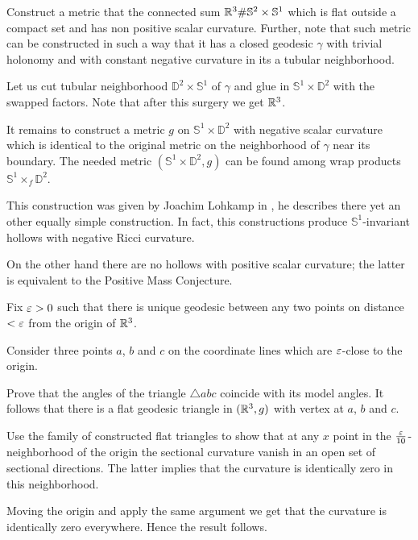 Construct a metric that the connected sum
$\mathbb{R}^3\#\mathbb{S}^2\times\mathbb{S}^1$
which is flat outside a compact set and has non positive scalar curvature.
Further, note that such metric can be constructed in such a way that it has a closed geodesic $\gamma$ with trivial holonomy and with constant negative curvature in its a tubular neighborhood.

Let us cut tubular neighborhood $\mathbb{D}^2\times \mathbb{S}^1$ of $\gamma$ and glue in $\mathbb{S}^1\times \mathbb{D}^2$ with the swapped factors. 
Note that after this surgery we get $\mathbb{R}^3$.

It remains to construct a metric $g$ on $\mathbb{S}^1\times \mathbb{D}^2$ with negative scalar curvature which 
is identical to the original metric on the neighborhood  of $\gamma$ near its boundary.
The needed metric $(\mathbb{S}^1\times \mathbb{D}^2,g)$ can be found among wrap products $\mathbb{S}^1\times_f \mathbb{D}^2$.
\qeds


This construction was given by Joachim Lohkamp in \cite{lohkamp},
he describes there yet an other equally simple construction.
In fact,
this  constructions produce 
$\mathbb{S}^1$-invariant hollows 
with negative Ricci curvature.

On the other hand there are no hollows with positive scalar curvature;
the latter is equivalent to the Positive Mass Conjecture.

Fix $\varepsilon>0$ such that there is unique geodesic between any two points on distance $<\varepsilon$ from the origin of $\mathbb{R}^3$.

Consider three points $a$, $b$ and $c$ 
on the coordinate lines which are $\varepsilon$-close 
to the origin.

Prove that the angles of the triangle $\triangle abc$
coincide with its model angles.
It follows that there is a flat geodesic triangle in $(\mathbb{R}^3,g)$ with vertex at $a$, $b$ and $c$.

Use the family of constructed flat triangles 
to show that at any $x$ point in the $\tfrac{\varepsilon}{10}$-neighborhood of the origin
the sectional curvature 
vanish in an open set of sectional directions.
The latter implies that the curvature is identically zero 
in this neighborhood.

Moving the origin and apply the same argument we get that the curvature is identically zero everywhere.
Hence the result follows. 
\qeds

